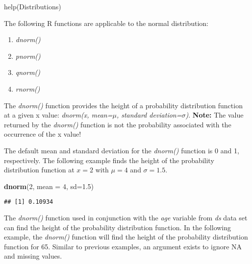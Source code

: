 \documentclass[]{article}
\newenvironment{Shaded}{\begin{snugshade}}{\end{snugshade}}
\newcommand{\KeywordTok}[1]{\textcolor[rgb]{0.13,0.29,0.53}{\textbf{#1}}}
\newcommand{\DataTypeTok}[1]{\textcolor[rgb]{0.13,0.29,0.53}{#1}}
\newcommand{\DecValTok}[1]{\textcolor[rgb]{0.00,0.00,0.81}{#1}}
\newcommand{\FloatTok}[1]{\textcolor[rgb]{0.00,0.00,0.81}{#1}}
\newcommand{\OperatorTok}[1]{\textcolor[rgb]{0.81,0.36,0.00}{\textbf{#1}}}
\newcommand{\NormalTok}[1]{#1}
\providecommand{\tightlist}{%
  \setlength{\itemsep}{0pt}\setlength{\parskip}{0pt}}
\begin{document}
help(Distributions)

The following R functions are applicable to the normal distribution:

\begin{enumerate}
\def\labelenumi{\arabic{enumi}.}
\tightlist
\item
  \emph{dnorm()}
\item
  \emph{pnorm()}
\item
  \emph{qnorm()}
\item
  \emph{rnorm()}
\end{enumerate}

The \emph{dnorm()} function provides the height of a probability
distribution function at a given x value: \emph{dnorm(x, mean=\(\mu\),
standard deviation=\(\sigma\))}. \textbf{Note:} The value returned by
the \emph{dnorm()} function is not the probability associated with the
occurrence of the x value!

The default mean and standard deviation for the \emph{dnorm()} function
is 0 and 1, respectively. The following example finds the height of the
probability distribution function at \(x=2\) with \(\mu = 4\) and
\(\sigma = 1.5\).

\begin{Shaded}
\begin{Highlighting}[]
\KeywordTok{dnorm}\NormalTok{(}\DecValTok{2}\NormalTok{, }\DataTypeTok{mean =} \DecValTok{4}\NormalTok{, }\DataTypeTok{sd=}\FloatTok{1.5}\NormalTok{)}
\end{Highlighting}
\end{Shaded}

\begin{verbatim}
## [1] 0.10934
\end{verbatim}

The \emph{dnorm()} function used in conjunction with the \emph{age}
variable from \emph{ds} data set can find the height of the probability
distribution function. In the following example, the \emph{dnorm()}
function will find the height of the probability distribution function
for 65. Similar to previous examples, an argument exists to ignore NA
and missing values.

\begin{Shaded}
\end{Shaded}
\end{document}
